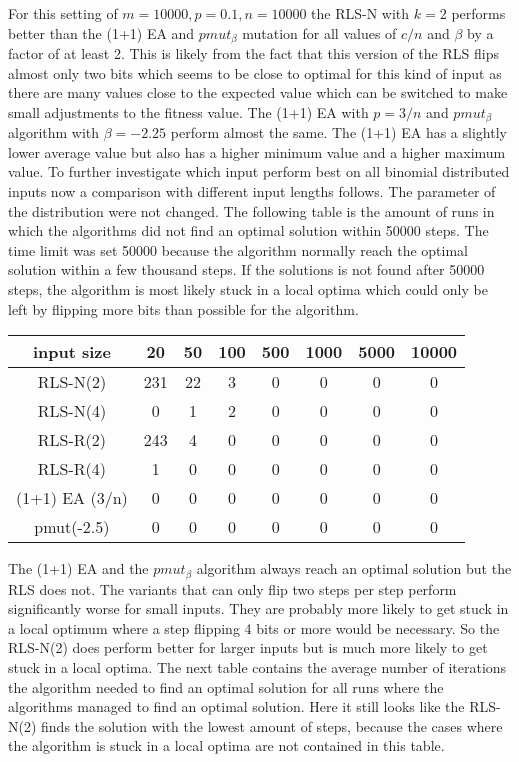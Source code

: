 For this setting of $m=10000, p=0.1, n=10000$ the RLS-N with $k=2$ performs better than the  (1+1) EA and $pmut_\beta$ mutation for all values of $c/n$ and $\beta$ by a factor of at least 2.
This is likely from the fact that this version of the RLS flips almost only two bits which seems to be close to optimal for this kind of input as there are many values close to the expected value which can be switched to make small adjustments to the fitness value.
The (1+1) EA with $p=3/n$ and $pmut_\beta$ algorithm with $\beta=-2.25$ perform almost the same.
The (1+1) EA has a slightly lower average value but also has a higher minimum value and a higher maximum value.
To further investigate which input perform best on all binomial distributed inputs now a comparison with different input lengths follows. The parameter of the distribution were not changed.
The following table is the amount of runs in which the algorithms did not find an optimal solution within 50000 steps.
The time limit was set 50000 because the algorithm normally reach the optimal solution within a few thousand steps.
If the solutions is not found after 50000 steps, the algorithm is most likely stuck in a local optima which could only be left by flipping more bits than possible for the algorithm.

\begin{tabular}{cccccccc}
      input size    & 20  & 50 & 100 & 500 & 1000 & 5000 & 10000 \\\hline
      RLS-N(2)      & 231 & 22 & 3   & 0   & 0    & 0    & 0     \\
      RLS-N(4)      & 0   & 1  & 2   & 0   & 0    & 0    & 0     \\
      RLS-R(2)      & 243 & 4  & 0   & 0   & 0    & 0    & 0     \\
      RLS-R(4)      & 1   & 0  & 0   & 0   & 0    & 0    & 0     \\
      (1+1) EA (3/n) & 0   & 0  & 0   & 0   & 0    & 0    & 0     \\
      pmut(-2.5)    & 0   & 0  & 0   & 0   & 0    & 0    & 0     \\
\end{tabular}

The (1+1) EA and the $pmut_\beta$ algorithm always reach an optimal solution but the RLS does not.
The variants that can only flip two steps per step perform significantly worse for small inputs.
They are probably more likely to get stuck in a local optimum where a step flipping 4 bits or more would be necessary.
So the RLS-N(2) does perform better for larger inputs but is much more likely to get stuck in a local optima.
The next table contains the average number of iterations the algorithm needed to find an optimal solution for all runs where the algorithms managed to find an optimal solution.
Here it still looks like the RLS-N(2) finds the solution with the lowest amount of steps, because the cases where the algorithm is stuck in a local optima are not contained in this table.

